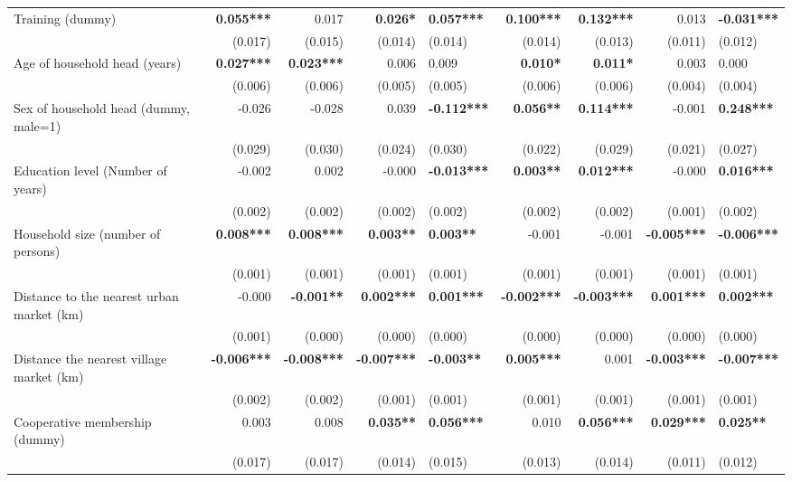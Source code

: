 \documentclass[
]{article}
\begin{document}
\begin{landscape}
\begin{longtable}[t]{lrrrlrrrl}
\endfoot
\bottomrule
\endlastfoot
Training (dummy) & \textbf{0.055***} & 0.017 & \textbf{0.026*} & \textbf{0.057***} & \textbf{0.100***} & \textbf{0.132***} & 0.013 & \textbf{-0.031***}\\
 & (0.017) & (0.015) & (0.014) & (0.014) & (0.014) & (0.013) & (0.011) & (0.012)\\
Age of household head (years) & \textbf{0.027***} & \textbf{0.023***} & 0.006 & 0.009 & \textbf{0.010*} & \textbf{0.011*} & 0.003 & 0.000\\
 & (0.006) & (0.006) & (0.005) & (0.005) & (0.006) & (0.006) & (0.004) & (0.004)\\
Sex of household head (dummy, male=1) & -0.026 & -0.028 & 0.039 & \textbf{-0.112***} & \textbf{0.056**} & \textbf{0.114***} & -0.001 & \textbf{0.248***}\\
\addlinespace
 & (0.029) & (0.030) & (0.024) & (0.030) & (0.022) & (0.029) & (0.021) & (0.027)\\
Education level (Number of years) & -0.002 & 0.002 & -0.000 & \textbf{-0.013***} & \textbf{0.003**} & \textbf{0.012***} & -0.000 & \textbf{0.016***}\\
 & (0.002) & (0.002) & (0.002) & (0.002) & (0.002) & (0.002) & (0.001) & (0.002)\\
Household size (number of persons) & \textbf{0.008***} & \textbf{0.008***} & \textbf{0.003**} & \textbf{0.003**} & -0.001 & -0.001 & \textbf{-0.005***} & \textbf{-0.006***}\\
 & (0.001) & (0.001) & (0.001) & (0.001) & (0.001) & (0.001) & (0.001) & (0.001)\\
\addlinespace
Distance to the nearest urban market (km) & -0.000 & \textbf{-0.001**} & \textbf{0.002***} & \textbf{0.001***} & \textbf{-0.002***} & \textbf{-0.003***} & \textbf{0.001***} & \textbf{0.002***}\\
 & (0.001) & (0.000) & (0.000) & (0.000) & (0.000) & (0.000) & (0.000) & (0.000)\\
Distance the nearest village market (km) & \textbf{-0.006***} & \textbf{-0.008***} & \textbf{-0.007***} & \textbf{-0.003**} & \textbf{0.005***} & 0.001 & \textbf{-0.003***} & \textbf{-0.007***}\\
 & (0.002) & (0.002) & (0.001) & (0.001) & (0.001) & (0.001) & (0.001) & (0.001)\\
Cooperative membership (dummy) & 0.003 & 0.008 & \textbf{0.035**} & \textbf{0.056***} & 0.010 & \textbf{0.056***} & \textbf{0.029***} & \textbf{0.025**}\\
\addlinespace
 & (0.017) & (0.017) & (0.014) & (0.015) & (0.013) & (0.014) & (0.011) & (0.012)\\

\end{longtable}
\end{landscape}
\end{document}
